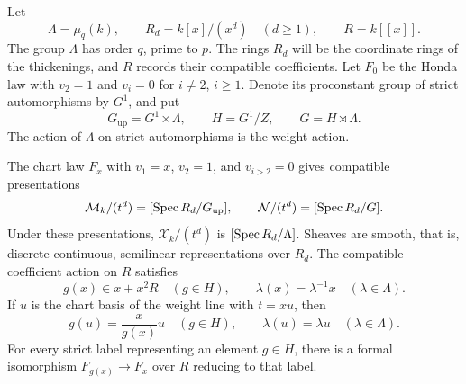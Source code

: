 Let
\[
 \Lambda=\mu_q(k),\qquad R_d=k[x]/(x^d)\quad(d\geq1),
 \qquad R=k[[x]].
\]
The group $\Lambda$ has order $q$, prime to $p$.  The rings $R_d$
will be the coordinate rings of the thickenings, and $R$ records their
compatible coefficients.  Let $F_0$ be the Honda law with $v_2=1$
and $v_i=0$ for $i\ne2$, $i\geq1$.
Denote its proconstant group of strict automorphisms by $G^1$, and put
\[
 G_{\mathrm{up}}=G^1\rtimes\Lambda,\qquad
 H=G^1/Z,\qquad G=H\rtimes\Lambda.
\]
The action of $\Lambda$ on strict automorphisms is the weight action.

\begin{proposition}\label{geom:thickened-charts}
The chart law $F_x$ with $v_1=x$, $v_2=1$, and $v_{i>2}=0$
gives compatible presentations
\begin{equation}\label{geom:quotient-thickenings}
 \mathcal M_k/(t^d)=[\operatorname{Spec} R_d/G_{\mathrm{up}}],\qquad
 \mathcal N/(t^d)=[\operatorname{Spec} R_d/G].
\end{equation}
Under these presentations, $\mathcal X_k/(t^d)$ is
$[\operatorname{Spec} R_d/\Lambda]$.  Sheaves are smooth, that is, discrete
continuous, semilinear representations over $R_d$.
The compatible coefficient action on $R$ satisfies
\[
 g(x)\in x+x^2R\quad(g\in H),\qquad
 \lambda(x)=\lambda^{-1}x\quad(\lambda\in\Lambda).
\]
If $u$ is the chart basis of the weight line with $t=xu$, then
\begin{equation}\label{geom:twist-cocycle}
 g(u)=\frac{x}{g(x)}u\quad(g\in H),\qquad
 \lambda(u)=\lambda u\quad(\lambda\in\Lambda).
\end{equation}
For every strict label representing an element $g\in H$, there is
a formal isomorphism $F_{g(x)}\to F_x$ over $R$ reducing to that label.
\end{proposition}

